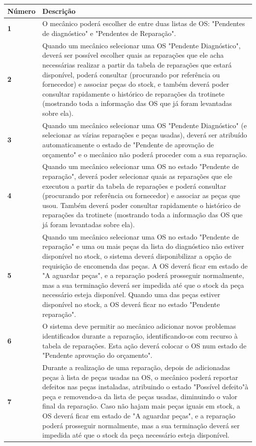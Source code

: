 \documentclass[11pt,a4paper]{article}
\begin{document}
	\begin{tabularx}{\textwidth}{@{}|l|X|@{}}
		\hline
		\rowcolor{gray!10} \textbf{Número} & \textbf{Descrição} \\ \hline
		\textbf{1} & O mecânico poderá escolher de entre duas listas de OS: "Pendentes de diagnóstico" e "Pendentes de Reparação". \\ \hline
		\textbf{2} & Quando um mecânico selecionar uma OS "Pendente Diagnóstico", deverá ser possível escolher quais as reparações que ele acha necessárias realizar a partir da tabela de reparações que estará disponível, poderá consultar (procurando por referência ou fornecedor) e associar peças do stock, e também deverá poder consultar rapidamente o histórico de reparações da trotinete (mostrando toda a informação das OS que já foram levantadas sobre ela). \\ \hline
		\textbf{3} & Quando um mecânico selecionar uma OS "Pendente Diagnóstico" (e selecionar as várias reparações e peças usadas), deverá ser atribuído automaticamente o estado de "Pendente de aprovação de orçamento" e o mecânico não poderá proceder com a sua reparação.\\ \hline
		\textbf{4} & Quando um mecânico selecionar uma OS no estado "Pendente de reparação", deverá poder selecionar quais as reparações que ele executou a partir da tabela de reparações e poderá consultar (procurando por referência ou  fornecedor) e associar as peças que usou. Também deverá poder consultar rapidamente o histórico de reparações da trotinete (mostrando toda a informação das OS que já foram levantadas sobre ela). \\ \hline	
		\textbf{5} & Quando um mecânico selecionar uma OS no estado "Pendente de reparação" \space e uma ou mais peças da lista do diagnóstico não estiver disponível no stock, o sistema deverá disponibilizar a opção de requisição de encomenda das peças. A OS deverá ficar em estado de "A aguardar peças", e a reparação poderá prosseguir normalmente, mas a sua terminação deverá ser impedida até que o stock da peça necessário esteja disponível. Quando uma das peças estiver disponível no stock, a OS deverá ficar no estado "Pendente reparação". \\ \hline
		\textbf{6} & O sistema deve permitir ao mecânico adicionar novos problemas identificados durante a reparação, identificando-os com recurso à tabela de reparações. Esta ação deverá colocar o OS num estado de "Pendente aprovação do orçamento". \\ \hline
		\textbf{7} & Durante a realização de uma reparação, depois de adicionadas peças à lista de peças usadas na OS, o mecânico poderá reportar defeitos nas peças instaladas, atribuindo o estado "Possível defeito"\space à peça e removendo-a da lista de peças usadas, diminuindo o valor final da reparação. Caso não hajam mais peças iguais em stock, a OS deverá ficar em estado de "A aguardar peças", e a reparação poderá prosseguir normalmente, mas a sua terminação deverá ser impedida até que o stock da peça necessário esteja disponível. \\ \hline

\end{tabularx}
\end{document}
